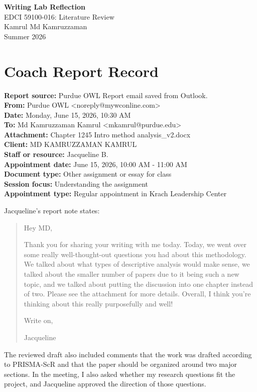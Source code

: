 \documentclass[11pt]{article}
\begin{document}
\begin{center}
{\Large \textbf{Writing Lab Reflection}}\\[0.35em]
EDCI 59100-016: Literature Review\\
Kamrul Md Kamruzzaman\\
Summer 2026
\end{center}

\section*{Coach Report Record}

\textbf{Report source:} Purdue OWL Report email saved from Outlook.\\
\textbf{From:} Purdue OWL \textless noreply@mywconline.com\textgreater\\
\textbf{Date:} Monday, June 15, 2026, 10:30 AM\\
\textbf{To:} Md Kamruzzaman Kamrul \textless mkamrul@purdue.edu\textgreater\\
\textbf{Attachment:} Chapter 1245 Intro method analysis\_v2.docx\\
\textbf{Client:} MD KAMRUZZAMAN KAMRUL\\
\textbf{Staff or resource:} Jacqueline B.\\
\textbf{Appointment date:} June 15, 2026, 10:00 AM - 11:00 AM\\
\textbf{Document type:} Other assignment or essay for class\\
\textbf{Session focus:} Understanding the assignment\\
\textbf{Appointment type:} Regular appointment in Krach Leadership Center

Jacqueline's report note states:

\begin{quote}
Hey MD,

Thank you for sharing your writing with me today. Today, we went over some really well-thought-out questions you had about this methodology. We talked about what types of descriptive analysis would make sense, we talked about the smaller number of papers due to it being such a new topic, and we talked about putting the discussion into one chapter instead of two. Please see the attachment for more details. Overall, I think you're thinking about this really purposefully and well!

Write on,

Jacqueline
\end{quote}

The reviewed draft also included comments that the work was drafted according to PRISMA-ScR and that the paper should be organized around two major sections. In the meeting, I also asked whether my research questions fit the project, and Jacqueline approved the direction of those questions.
\end{document}
